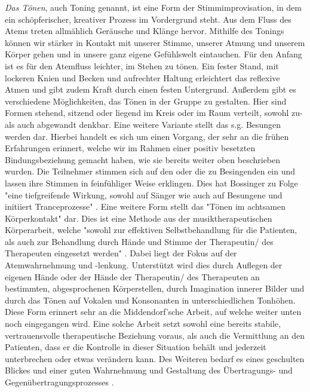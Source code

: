 \emph{Das Tönen}, auch Toning genannt, ist eine Form der Stimmimprovisation, in dem ein schöpferischer, kreativer Prozess im Vordergrund steht. Aus dem Fluss des Atems treten allmählich Geräusche und Klänge hervor. Mithilfe des Tonings können wir stärker in Kontakt mit unserer Stimme, unserer Atmung und unserem Körper gehen und in unsere ganz eigene Gefühlswelt eintauchen. Für den Anfang ist es für den Atemfluss leichter, im Stehen zu tönen. Ein fester Stand, mit lockeren Knien und Becken und aufrechter Haltung erleichtert das reflexive Atmen und gibt zudem Kraft durch einen festen Untergrund. Außerdem gibt es verschiedene Möglichkeiten, das Tönen in der Gruppe zu gestalten. Hier sind Formen stehend, sitzend oder liegend im Kreis oder im Raum verteilt, sowohl zu- als auch abgewandt denkbar. Eine weitere Variante stellt das s.g. Besungen werden dar. Hierbei handelt es sich um einen Vorgang, der sehr an die frühen Erfahrungen erinnert, welche wir im Rahmen einer positiv besetzten Bindungsbeziehung gemacht haben, wie sie bereits weiter oben beschrieben wurden. Die Teilnehmer stimmen sich auf  den oder die zu Besingenden ein und lassen ihre Stimmen in feinfühliger Weise erklingen. Dies hat Bossinger zu Folge "eine tiefgreifende Wirkung, sowohl auf Sänger wie auch auf Besungene und initiiert Tranceprozesse" \autocite[275]{bossinger2006}. Eine weitere Form stellt das "Tönen im achtsamen Körperkontakt" \autocite [208]{rittner2008} dar. Dies ist eine Methode aus der musiktherapeutischen Körperarbeit, welche "sowohl zur effektiven Selbstbehandlung für die Patienten, als auch zur Behandlung durch Hände und Stimme der Therapeutin/ des Therapeuten eingesetzt werden" \autocite [208]{rittner2008}. Dabei liegt der Fokus auf der Atemwahrnehmung und -lenkung. Unterstützt wird dies durch Auflegen der eigenen Hände oder der Hände der Therapeutin/ des Therapeuten an bestimmten, abgesprochenen Körperstellen, durch Imagination innerer Bilder und durch das Tönen auf Vokalen und Konsonanten in unterschiedlichen Tonhöhen. Diese Form erinnert sehr an die Middendorf'sche Arbeit, auf welche weiter unten noch eingegangen wird. Eine solche Arbeit setzt sowohl eine bereits stabile, vertrauensvolle therapeutische Beziehung voraus, als auch die Vermittlung an den Patienten, dass er die Kontrolle in dieser Situation behält und jederzeit unterbrechen oder etwas verändern kann. Des Weiteren bedarf es eines geschulten Blickes und einer guten Wahrnehmung und Gestaltung des Übertragungs- und Gegenübertragungsprozesses \autocite[vgl.][60]{rittner2012}.

